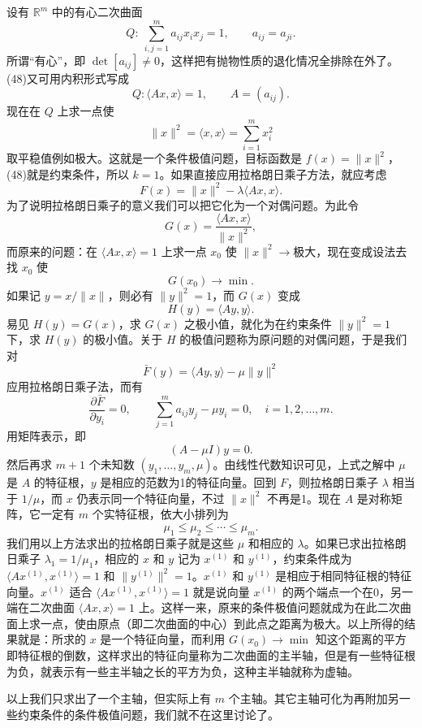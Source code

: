设有 $\mathbb R^m$ 中的有心二次曲面
\begin{equation}
 Q:\ \sum_{i,j=1}^{m}a_{ij}x_ix_j=1,
 \qquad a_{ij}=a_{ji}.
 \tag{48}
\end{equation}
所谓“有心”，即 $\det[a_{ij}]\ne0$，这样把有抛物性质的退化情况全排除在外了。(48)又可用内积形式写成
\begin{equation}
 Q:\langle Ax,x\rangle=1,\qquad A=(a_{ij}).
 \tag{48'}
\end{equation}
现在在 $Q$ 上求一点使
\[
 \|x\|^2=\langle x,x\rangle=\sum_{i=1}^{m}x_i^2
\]
取平稳值例如极大。这就是一个条件极值问题，目标函数是 $f(x)=\|x\|^2$，(48)就是约束条件，所以 $k=1$。如果直接应用拉格朗日乘子方法，就应考虑
\[
 F(x)=\|x\|^2-\lambda\langle Ax,x\rangle.
\]
为了说明拉格朗日乘子的意义我们可以把它化为一个对偶问题。为此令
\[
 G(x)=\frac{\langle Ax,x\rangle}{\|x\|^2},
\]
而原来的问题：在 $\langle Ax,x\rangle=1$ 上求一点 $x_0$ 使 $\|x\|^2\to$极大，现在变成设法去找 $x_0$ 使
\[
 G(x_0)\to\min.
\]
如果记 $y=x/\|x\|$，则必有 $\|y\|^2=1$，而 $G(x)$ 变成
\[
 H(y)=\langle Ay,y\rangle.
\]
易见 $H(y)=G(x)$，求 $G(x)$ 之极小值，就化为在约束条件 $\|y\|^2=1$ 下，求 $H(y)$ 的极小值。关于 $H$ 的极值问题称为原问题的对偶问题，于是我们对
\[
 \bar F(y)=\langle Ay,y\rangle-\mu\|y\|^2
\]
应用拉格朗日乘子法，而有
\[
 \frac{\partial\bar F}{\partial y_i}=0,
 \qquad
 \sum_{j=1}^{m}a_{ij}y_j-\mu y_i=0,
 \quad i=1,2,\ldots,m.
\]
用矩阵表示，即
\begin{equation}
 (A-\mu I)y=0.
 \tag{49}
\end{equation}
然后再求 $m+1$ 个未知数 $(y_1,\ldots,y_m,\mu)$。由线性代数知识可见，上式之解中 $\mu$ 是 $A$ 的特征根，$y$ 是相应的范数为1的特征向量。回到 $F$，则拉格朗日乘子 $\lambda$ 相当于 $1/\mu$，而 $x$ 仍表示同一个特征向量，不过 $\|x\|^2$ 不再是1。现在 $A$ 是对称矩阵，它一定有 $m$ 个实特征根，依大小排列为
\[
 \mu_1\le\mu_2\le\cdots\le\mu_m.
\]
我们用以上方法求出的拉格朗日乘子就是这些 $\mu$ 和相应的 $\lambda$。如果已求出拉格朗日乘子 $\lambda_1=1/\mu_1$，相应的 $x$ 和 $y$ 记为 $x^{(1)}$ 和 $y^{(1)}$，约束条件成为 $\langle Ax^{(1)},x^{(1)}\rangle=1$ 和 $\|y^{(1)}\|^2=1$。$x^{(1)}$ 和 $y^{(1)}$ 是相应于相同特征根的特征向量。$x^{(1)}$ 适合 $\langle Ax^{(1)},x^{(1)}\rangle=1$ 就是说向量 $x^{(1)}$ 的两个端点一个在0，另一端在二次曲面 $\langle Ax,x\rangle=1$ 上。这样一来，原来的条件极值问题就成为在此二次曲面上求一点，使由原点（即二次曲面的中心）到此点之距离为极大。以上所得的结果就是：所求的 $x$ 是一个特征向量，而利用 $G(x_0)\to\min$ 知这个距离的平方即特征根的倒数，这样求出的特征向量称为二次曲面的主半轴，但是有一些特征根为负，就表示有一些主半轴之长的平方为负，这种主半轴就称为虚轴。

以上我们只求出了一个主轴，但实际上有 $m$ 个主轴。其它主轴可化为再附加另一些约束条件的条件极值问题，我们就不在这里讨论了。

